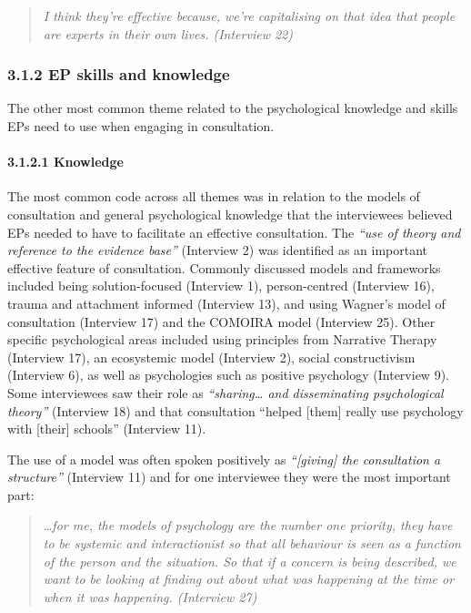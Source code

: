 \documentclass[
  english,
  man]{apa}
\let\oldparagraph\paragraph
\renewcommand{\paragraph}[1]{\oldparagraph{#1}\mbox{}}
\begin{document}
\begin{quote}
\emph{I think they're effective because, we're capitalising on that idea
that people are experts in their own lives. (Interview 22)}
\end{quote}

\hypertarget{ep-skills-and-knowledge}{%
\subsubsection{3.1.2 EP skills and knowledge}\label{ep-skills-and-knowledge}}

The other most common theme related to the psychological knowledge and skills EPs need to use when engaging in consultation.

\hypertarget{knowledge}{%
\paragraph{3.1.2.1 Knowledge}\label{knowledge}}

The most common code across all themes was in relation to the models of consultation and general psychological knowledge that the interviewees believed EPs needed to have to facilitate an effective consultation. The \emph{``use of theory and reference to the evidence base''} (Interview 2) was identified as an important effective feature of consultation. Commonly discussed models and frameworks included being solution-focused (Interview 1), person-centred (Interview 16), trauma and attachment informed (Interview 13), and using Wagner's model of consultation (Interview 17) and the COMOIRA model (Interview 25). Other specific psychological areas included using principles from Narrative Therapy (Interview 17), an ecosystemic model (Interview 2), social constructivism (Interview 6), as well as psychologies such as positive psychology (Interview 9). Some interviewees saw their role as \emph{``sharing\ldots{} and disseminating psychological theory''} (Interview 18) and that consultation ``helped {[}them{]} really use psychology with {[}their{]} schools'' (Interview 11).

The use of a model was often spoken positively as \emph{``{[}giving{]} the consultation a structure''} (Interview 11) and for one interviewee they were the most important part:

\begin{quote}
\emph{\ldots for me, the models of psychology are the number one priority, they
have to be systemic and interactionist so that all behaviour is seen
as a function of the person and the situation. So that if a concern is
being described, we want to be looking at finding out about what was
happening at the time or when it was happening. (Interview 27)}
\end{quote}
\end{document}
